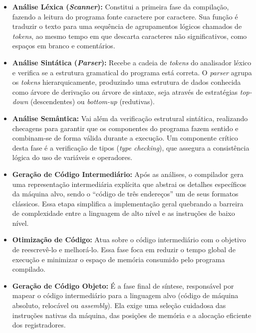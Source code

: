 \begin{itemize}
    \item \textbf{Análise Léxica (\textit{Scanner}):} Constitui a primeira fase da compilação, fazendo a leitura do programa fonte caractere por caractere.
    Sua função é traduzir o texto para uma sequência de agrupamentos lógicos chamados de \textit{tokens}, ao mesmo tempo em que descarta caracteres não significativos, como espaços em branco e comentários.

    \item \textbf{Análise Sintática (\textit{Parser}):} Recebe a cadeia de \textit{tokens} do analisador léxico e verifica se a estrutura gramatical do programa está correta.
    O \textit{parser} agrupa os \textit{tokens} hierarquicamente, produzindo uma estrutura de dados conhecida como árvore de derivação ou árvore de sintaxe, seja através de estratégias \textit{top-down} (descendentes) ou \textit{bottom-up} (redutivas).

    \item \textbf{Análise Semântica:} Vai além da verificação estrutural sintática, realizando checagens para garantir que os componentes do programa fazem sentido e combinam-se de forma válida durante a execução.
    Um componente crítico desta fase é a verificação de tipos (\textit{type checking}), que assegura a consistência lógica do uso de variáveis e operadores.

    \item \textbf{Geração de Código Intermediário:} Após as análises, o compilador gera uma representação intermediária explícita que abstrai os detalhes específicos da máquina alvo, sendo o ``código de três endereços'' um de seus formatos clássicos.
    Essa etapa simplifica a implementação geral quebrando a barreira de complexidade entre a linguagem de alto nível e as instruções de baixo nível.

    \item \textbf{Otimização de Código:} Atua sobre o código intermediário com o objetivo de reescrevê-lo e melhorá-lo.
    Essa fase foca em reduzir o tempo global de execução e minimizar o espaço de memória consumido pelo programa compilado.

    \item \textbf{Geração de Código Objeto:} É a fase final de síntese, responsável por mapear o código intermediário para a linguagem alvo (código de máquina absoluto, relocável ou \textit{assembly}).
    Ela exige uma seleção cuidadosa das instruções nativas da máquina, das posições de memória e a alocação eficiente dos registradores.
\end{itemize}

